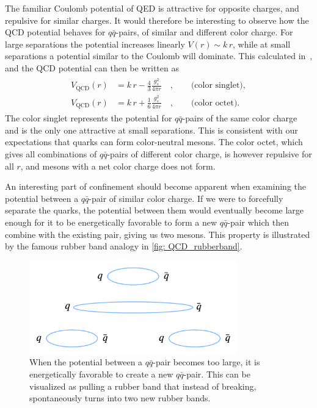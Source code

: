 \documentclass[main.tex]{subfiles}
\begin{document}
The familiar Coulomb potential of QED is attractive for opposite charges, and repulsive for similar charges. It would therefore be interesting to observe how the QCD potential behaves for \(q \bar q\)-pairs, of similar and different color charge. For large separations the potential increases linearly \(V(r) \sim k\, r\), while at small separations a potential similar to the Coulomb will dominate. This calculated in~\cite[p.512-513]{schwartz2014quantum}, and the QCD potential can then be written as
\begin{align}\label{eqn: QCD_potential}
    \begin{split}
    V_{\text{QCD}}(r) &= k\,r - \frac{4}{3} \frac{g_s^2}{4\pi r} \quad, \qquad \text{(color singlet)}, \\
    V_{\text{QCD}}(r) &= k\,r + \frac{1}{6} \frac{g_s^2}{4\pi r} \quad, \qquad \text{(color octet)}.
    \end{split}
\end{align}
The color singlet represents the potential for \(q \bar q\)-pairs of the same color charge and is the only one attractive at small separations. This is consistent with our expectations that quarks can form color-neutral mesons. The color octet, which gives all combinations of \(q \bar q\)-pairs of different color charge, is however repulsive for all \(r\), and mesons with a net color charge does not form. 

An interesting part of confinement should become apparent when examining the potential between a \(q \bar q\)-pair of similar color charge. If we were to forcefully separate the quarks, the potential between them would eventually become large enough for it to be energetically favorable to form a new \(q \bar q\)-pair which then combine with the existing pair, giving us two mesons. This property is illustrated by the famous rubber band analogy in \autoref{fig: QCD_rubberband}. 
\begin{figure}[htb]
    \centering
    \includegraphics[width=9cm]{pictures/figures/QCD_potential_rubberband.png}
    \caption{When the potential between a \(q\bar q\)-pair becomes too large, it is energetically favorable to create a new \(q\bar q\)-pair. This can be visualized as pulling a rubber band that instead of breaking, spontaneously turns into two new rubber bands.}
    \label{fig: QCD_rubberband}
\end{figure}
\end{document}
